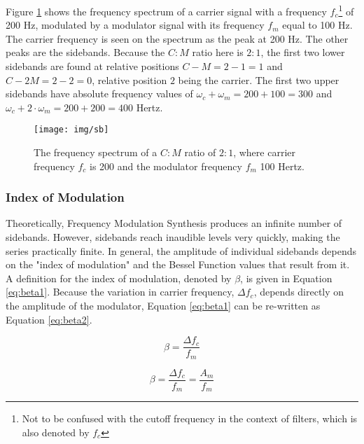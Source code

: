   \noindent Figure \ref{fig:sb} shows the frequency spectrum of a carrier signal with a frequency $f_{c}$\footnote{Not to be confused with the cutoff frequency in the context of filters, which is also denoted by $f_{c}$} of 200 Hz, modulated by a modulator signal with its frequency $f_{m}$ equal to 100 Hz. The carrier frequency is seen on the spectrum as the peak at 200 Hz. The other peaks are the sidebands. Because the $C:M$ ratio here is $2:1$, the first two lower sidebands are found at relative positions $C-M=2-1=1$ and $C-2M=2-2=0$, relative position $2$ being the carrier. The first two upper sidebands have absolute frequency values of $\omega_{c} + \omega_{m} = 200 + 100 = 300$ and %
  $\omega_{c} +2\cdot\omega_{m} = 200 + 200 = 400$ Hertz.\\

  \begin{figure}[]
    \texttt{[image: img/sb]}
    \caption{The frequency spectrum of a $C:M$ ratio of $2:1$, where carrier frequency $f_{c}$ is 200 and the modulator frequency $f_{m}$ 100 Hertz.}
    \label{fig:sb}
  \end{figure}

  \pagebreak

  \subsubsection{Index of Modulation}

  Theoretically, Frequency Modulation Synthesis produces an infinite number of sidebands. However, sidebands reach inaudible levels very quickly, making the series practically finite. In general, the amplitude of individual sidebands depends on the "index of modulation" and the Bessel Function values that result from it. A definition for the index of modulation, denoted by $\beta$, is given in Equation \ref{eq:beta1}. Because the variation in carrier frequency, $\Delta f_{c}$, depends directly on the amplitude of the modulator, Equation \ref{eq:beta1} can be re-written as Equation \ref{eq:beta2}.

  \begin{multicols}{2}

    \begin{equation}
      \beta = \frac{\Delta f_{c}}{f_{m}}
      \label{eq:beta1}
    \end{equation}

    \begin{equation}
      \beta = \frac{\Delta f_{c}}{f_{m}} = \frac{A_{m}}{f_{m}}
      \label{eq:beta2}
    \end{equation}

  \end{multicols}

